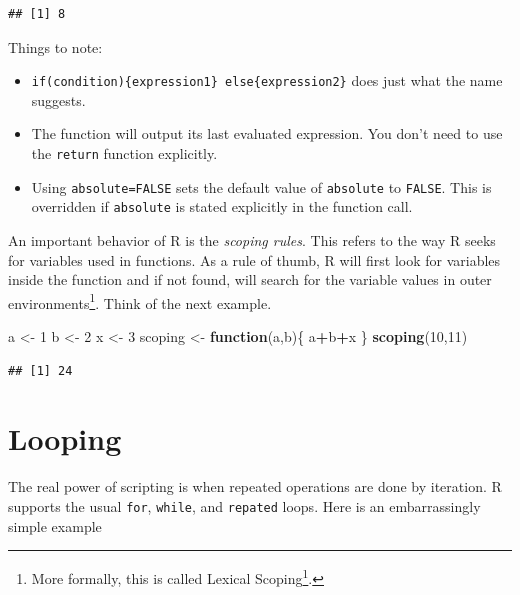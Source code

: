 \documentclass[]{book}
\newenvironment{Shaded}{\begin{snugshade}}{\end{snugshade}}
\newcommand{\ControlFlowTok}[1]{\textcolor[rgb]{0.13,0.29,0.53}{\textbf{#1}}}
\newcommand{\DecValTok}[1]{\textcolor[rgb]{0.00,0.00,0.81}{#1}}
\newcommand{\KeywordTok}[1]{\textcolor[rgb]{0.13,0.29,0.53}{\textbf{#1}}}
\newcommand{\NormalTok}[1]{#1}
\newcommand{\OperatorTok}[1]{\textcolor[rgb]{0.81,0.36,0.00}{\textbf{#1}}}
\newcommand{\StringTok}[1]{\textcolor[rgb]{0.31,0.60,0.02}{#1}}
\renewcommand{\href}[2]{#2\footnote{\url{#1}}}
\theoremstyle{definition}
\theoremstyle{definition}
\theoremstyle{definition}
\theoremstyle{remark}
\begin{document}
\begin{verbatim}
## [1] 8
\end{verbatim}

Things to note:

\begin{itemize}
\item
  \texttt{if(condition)\{expression1\}\ else\{expression2\}} does just what the name suggests.
\item
  The function will output its last evaluated expression. You don't need to use the \texttt{return} function explicitly.
\item
  Using \texttt{absolute=FALSE} sets the default value of \texttt{absolute} to \texttt{FALSE}. This is overridden if \texttt{absolute} is stated explicitly in the function call.
\end{itemize}

An important behavior of R is the \emph{scoping rules}.
This refers to the way R seeks for variables used in functions.
As a rule of thumb, R will first look for variables inside the function and if not found, will search for the variable values in outer environments\footnote{More formally, this is called \href{https://darrenjw.wordpress.com/2011/11/23/lexical-scope-and-function-closures-in-r/}{Lexical Scoping}.}.
Think of the next example.

\begin{Shaded}
\begin{Highlighting}[]
\NormalTok{a <-}\StringTok{ }\DecValTok{1}
\NormalTok{b <-}\StringTok{ }\DecValTok{2}
\NormalTok{x <-}\StringTok{ }\DecValTok{3}
\NormalTok{scoping <-}\StringTok{ }\ControlFlowTok{function}\NormalTok{(a,b)\{}
\NormalTok{  a}\OperatorTok{+}\NormalTok{b}\OperatorTok{+}\NormalTok{x}
\NormalTok{\}}
\KeywordTok{scoping}\NormalTok{(}\DecValTok{10}\NormalTok{,}\DecValTok{11}\NormalTok{)}
\end{Highlighting}
\end{Shaded}

\begin{verbatim}
## [1] 24
\end{verbatim}

\hypertarget{looping}{%
\section{Looping}\label{looping}}

The real power of scripting is when repeated operations are done by iteration.
R supports the usual \texttt{for}, \texttt{while}, and \texttt{repated} loops.
Here is an embarrassingly simple example
\end{document}
